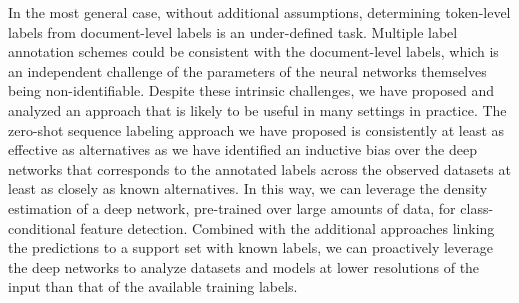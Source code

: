 \documentclass{clv3}
\begin{document}
In the most general case, without additional assumptions, determining token-level labels from document-level labels is an under-defined task. Multiple label annotation schemes could be consistent with the document-level labels, which is an independent challenge of the parameters of the neural networks themselves being non-identifiable. Despite these intrinsic challenges, we have proposed and analyzed an approach that is likely to be useful in many settings in practice. The zero-shot sequence labeling approach we have proposed is consistently at least as effective as alternatives as we have identified an inductive bias over the deep networks that corresponds to the annotated labels across the observed datasets at least as closely as known alternatives. In this way, we can leverage the density estimation of a deep network, pre-trained over large amounts of data, for class-conditional feature detection. Combined with the additional approaches linking the predictions to a support set with known labels, we can proactively leverage the deep networks to analyze datasets and models at lower resolutions of the input than that of the available training labels.

\clearpage
\end{document}
